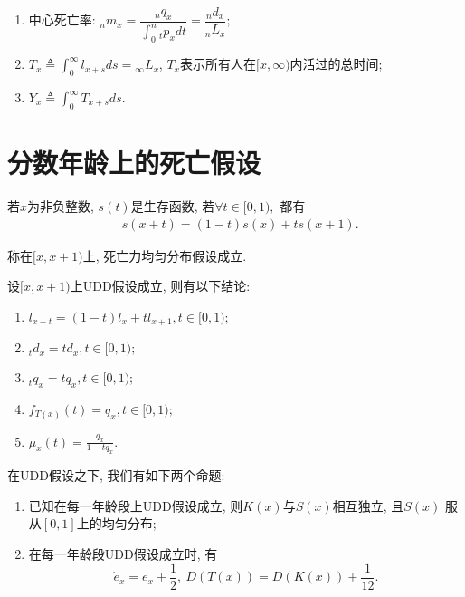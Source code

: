 \documentclass[lang=cn,10pt]{elegantbook}
\begin{document}
\begin{proposition}
	\begin{enumerate}
		\item 中心死亡率: ${}_nm_x=\dfrac {{}_nq_x}{\int_0^n{}_tp_xdt}=\dfrac{{}_nd_x}{{}_nL_x};$
		\item $T_x\triangleq\int_0^{\infty}l_{x+s}ds={}_{\infty}L_x$, $T_x$表示所有人在$[x,\infty)$内活过的总时间; 
		\item $Y_x\triangleq\int_0^{\infty}T_{x+s}ds.$
	\end{enumerate}
\end{proposition}

\section{分数年龄上的死亡假设}
\begin{definition}
	若$x$为非负整数, $s(t)$是生存函数, 若$\forall t\in [0,1),$ 都有
\begin{align}\label{tula}
     & s(x+t)=(1-t)s(x)+ts(x+1).
\end{align}

称在$[x,x+1)$上, 死亡力均匀分布假设成立.
\end{definition}

\begin{corollary}
	设$[x,x+1)$上UDD假设成立, 则有以下结论:
	\begin{enumerate}
		\item $l_{x+t}=(1-t)l_{x}+tl_{x+1},t\in [0,1);$
		\item $_{t}d_{x}=td_{x},t\in [0,1);$
		\item $_{t}q_{x}=tq_{x},t\in [0,1);$
		\item $f_{T(x)}(t)=q_{x},t\in [0,1);$
		\item $\mu_{x}(t)=\frac{q_{x}}{1-tq_x}.$
	\end{enumerate}
\end{corollary}

\begin{proposition}
	在UDD假设之下, 我们有如下两个命题:
	\begin{enumerate}
		\item 已知在每一年龄段上UDD假设成立, 则$K(x)$与$S(x)$相互独立, 且$S(x)$ 服从$[0,1]$上的均匀分布;
		\item 在每一年龄段UDD假设成立时, 有
    $$\mathring{e}_{x}=e_{x}+\frac{1}{2},\   D(T(x))=D(K(x))+\frac{1}{12}.$$
	\end{enumerate}
\end{proposition}
\end{document}

